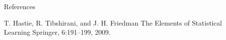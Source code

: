 
\appendix
\begin{frame}[allowframebreaks]{References}
\begin{thebibliography}{9}
	 T. Hastie, R. Tibshirani, and J. H. Friedman
	\newblock The Elements of Statistical Learning
	\newblock Springer, 6:191--199, 2009.
\end{thebibliography}
\end{frame}
